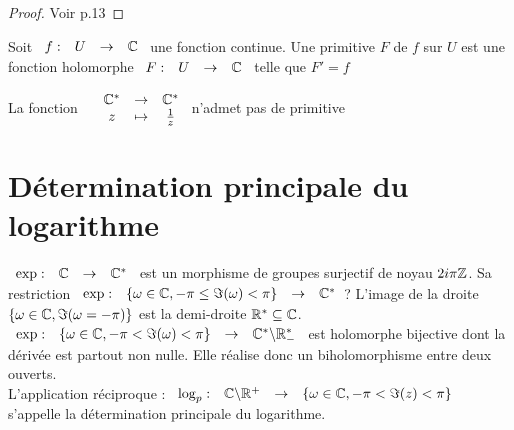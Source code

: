 \documentclass[]{report}
\begin{document}
\begin{proof}
    Voir p.13
\end{proof}

\begin{df}
    Soit $\begin{array}{ccccc}
f : & U & \to & \mathbb{C}
\end{array}$ une fonction continue. Une primitive $F$ de $f$ sur $U$ est une fonction holomorphe $\begin{array}{ccccc}
F : & U & \to & \mathbb{C}
\end{array}$ telle que $F'=f$
\end{df}

\begin{re}
    La fonction $\begin{array}{ccccc}
& \mathbb{C}^* & \to & \mathbb{C}^* \\
& z & \mapsto & \frac{1}{z}
\end{array}$ n'admet pas de primitive
\end{re}

\section*{Détermination principale du logarithme}

    $\begin{array}{ccccc}
\exp : & \mathbb{C} & \to & \mathbb{C}^* \\
\end{array}$ est un morphisme de groupes surjectif de noyau $2i\pi\mathbb{Z}$. Sa restriction $\begin{array}{ccccc}
\exp : & \left\{ \omega\in\mathbb{C},-\pi\le\Im(\omega)<\pi\right\} & \to & \mathbb{C}^*\\
\end{array}$? L'image de la droite $\left\{\omega\in\mathbb{C},\Im(\omega=-\pi)\right\}$ est la demi-droite $\mathbb{R}^*\subseteq \mathbb{C}$.\\
$\begin{array}{ccccc}
\exp : & \left\{ \omega\in\mathbb{C},-\pi<\Im(\omega)<\pi\right\} & \to & \mathbb{C}^*\backslash\mathbb{R}^*_- \\
\end{array}$ est holomorphe bijective dont la dérivée est partout non nulle. Elle réalise donc un biholomorphisme entre deux ouverts.\\
L'application réciproque : $\begin{array}{ccccc}
\log_p : & \mathbb{C}\backslash\mathbb{R}^+ & \to & \left\{\omega\in\mathbb{C},-\pi<\Im(z)<\pi\right\} \\
\end{array}$ s'appelle la détermination principale du logarithme.
\end{document}
